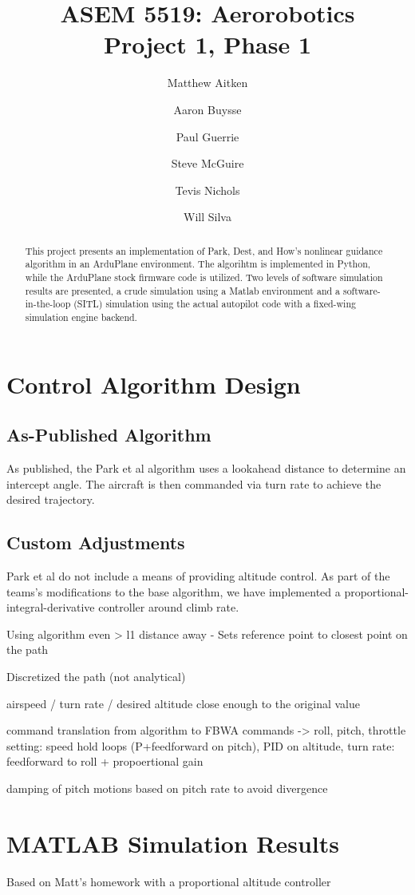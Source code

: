 \documentclass{aiaa}
\title{ASEM 5519: Aerorobotics \\ Project 1, Phase 1}
\author{Matthew Aitken \and Aaron Buysse \and Paul Guerrie \and Steve McGuire
\and Tevis Nichols \and Will Silva}
\begin{document}
\maketitle
\begin{abstract}
This project presents an implementation of Park, Dest, and How's nonlinear guidance algorithm in an ArduPlane environment. The algorihtm is implemented in Python, while the ArduPlane stock firmware code is utilized. Two levels of software simulation results are presented, a crude simulation using a Matlab environment and a software-in-the-loop (SITL) simulation using the actual autopilot code with a fixed-wing simulation engine backend.
\end{abstract}

\section{Control Algorithm Design}
\subsection{As-Published Algorithm}
As published, the Park et al algorithm uses a lookahead distance to determine an intercept angle. The aircraft is then commanded via turn rate to achieve the desired trajectory.
\subsection{Custom Adjustments}
Park et al do not include a means of providing altitude control. As part of the teams's modifications to the base algorithm, we have implemented a proportional-integral-derivative controller around climb rate.  

Using algorithm even > l1 distance away - Sets reference point to closest point on the path

Discretized the path (not analytical)

airspeed / turn rate / desired altitude close enough to the original value 

command translation from algorithm to FBWA commands -> roll, pitch, throttle setting: speed hold loops (P+feedforward on pitch), PID on altitude, turn rate: feedforward to roll + propoertional gain


damping of pitch motions based on pitch rate to avoid divergence

\section{MATLAB Simulation Results}
Based on Matt's homework with a proportional altitude controller
\end{document}
